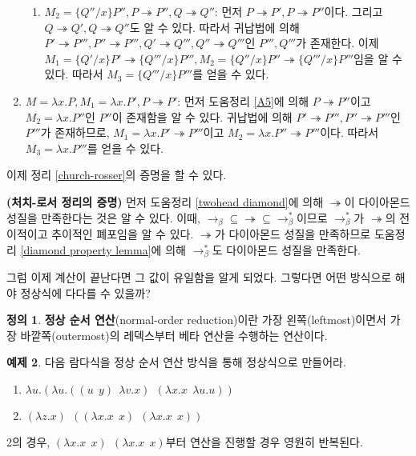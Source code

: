 \documentclass[b5paper, 11pt]{book}
\theoremstyle{definition}
\newtheorem{defn}{정의}[chapter]
\newtheorem{ex}[defn]{예제}
\newenvironment{pf*}{\pushQED{\qed}\pf}
{\popQED\endpf}
\begin{document}
\begin{pf*}
\begin{enumerate}
\begin{enumerate}
            \item $M_2 = \{Q'' / x\} P'', P\twoheadrightarrow P'', Q \twoheadrightarrow Q''$: 먼저 $P\twoheadrightarrow P', P \twoheadrightarrow P''$이다. 그리고 $Q \twoheadrightarrow Q', Q \twoheadrightarrow Q''$도 알 수 있다. 따라서 귀납법에 의해 $P' \twoheadrightarrow P''', P'' \twoheadrightarrow P''', Q' \twoheadrightarrow Q''', Q'' \twoheadrightarrow Q'''$인 $P''', Q'''$가 존재한다. 이제 $M_1 = \{Q' / x\} P' \twoheadrightarrow \{Q''' / x\} P''', M_2  = \{Q'' / x\} P'' \twoheadrightarrow \{Q''' / x\} P'''$임을 알 수 있다. 따라서 $M_3 = \{Q''' / x\} P'''$를 얻을 수 있다.
        \end{enumerate}
        \item $M = \lambda x. P, M_1 = \lambda x .P', P \twoheadrightarrow P'$: 먼저 도움정리 \ref{A5}에 의해 $ P \twoheadrightarrow P'' $이고 $M_2 = \lambda x . P''$인 $P''$이 존재함을 알 수 있다. 귀납법에 의해 $P' \twoheadrightarrow P''', P'' \twoheadrightarrow P'''$인 $P'''$가 존재하므로, $M_1 = \lambda x. P' \twoheadrightarrow P'''$이고 $M_2 = \lambda x. P'' \twoheadrightarrow P'''$이다. 따라서 $M_3 = \lambda x . P'''$를 얻을 수 있다. 
    \end{enumerate}
\end{pf*}
이제 정리 \ref{church-rosser}의 증명을 할 수 있다. 
\begin{pf*} 
    \textbf{(처치-로서 정리의 증명)} 먼저 도움정리 \ref{twohead diamond}에 의해 $\twoheadrightarrow$이 다이아몬드 성질을 만족한다는 것은 알 수 있다. 이때, $\rightarrow_\beta \subseteq \twoheadrightarrow \subseteq \rightarrow_\beta^*$이므로 $\rightarrow_\beta^*$가 $\twoheadrightarrow$의 전이적이고 추이적인 폐포임을 알 수 있다. $\twoheadrightarrow$가 다이아몬드 성질을 만족하므로 도움정리 \ref{diamond property lemma}에 의해 $\rightarrow_\beta^*$도 다이아몬드 성질을 만족한다.
\end{pf*}
그럼 이제 계산이 끝난다면 그 값이 유일함을 알게 되었다. 그렇다면 어떤 방식으로 해야 정상식에 다다를 수 있을까?
\begin{defn}
    \textbf{정상 순서 연산}(normal-order reduction)이란 가장 왼쪽(leftmost)이면서 가장 바깥쪽(outermost)의 레덱스부터 베타 연산을 수행하는 연산이다.
\end{defn}
\begin{ex}
    다음 람다식을 정상 순서 연산 방식을 통해 정상식으로 만들어라.
    \begin{enumerate}
        \item $\lambda u. (\lambda u. ((u \;\, y) \;\, \lambda v. x) \;\, (\lambda x. x \;\, \lambda u. u))$
        \item $(\lambda z. x) \;\, ((\lambda x . x \;\, x) \;\, (\lambda x. x \;\, x))$
    \end{enumerate}
    2의 경우, $(\lambda x . x \;\, x) \;\, (\lambda x. x \;\, x)$부터 연산을 진행할 경우 영원히 반복된다.
\end{ex}
\end{document}
